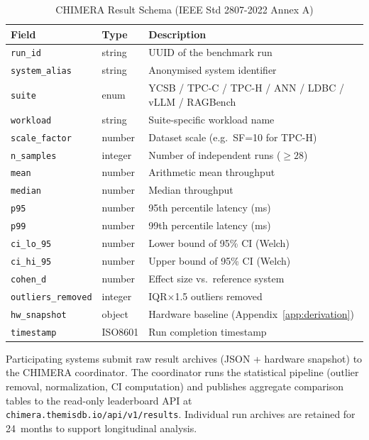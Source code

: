 \documentclass[conference]{IEEEtran}
\begin{document}
\begin{table}[h]
  \caption{CHIMERA Result Schema (IEEE Std 2807-2022 Annex A)}
  \label{tab:chimera-schema}
  \centering
  \begin{tabular}{L{2.2cm}L{1.5cm}L{3.5cm}}
    \toprule
    \textbf{Field} & \textbf{Type} & \textbf{Description} \\
    \midrule
    \texttt{run\_id}       & string  & UUID of the benchmark run \\
    \texttt{system\_alias} & string  & Anonymised system identifier \\
    \texttt{suite}         & enum    & YCSB / TPC-C / TPC-H / ANN /
                                       LDBC / vLLM / RAGBench \\
    \texttt{workload}      & string  & Suite-specific workload name \\
    \texttt{scale\_factor} & number  & Dataset scale (e.g.\ SF=10 for TPC-H) \\
    \texttt{n\_samples}    & integer & Number of independent runs ($\geq 28$) \\
    \texttt{mean}          & number  & Arithmetic mean throughput \\
    \texttt{median}        & number  & Median throughput \\
    \texttt{p95}           & number  & 95th percentile latency (ms) \\
    \texttt{p99}           & number  & 99th percentile latency (ms) \\
    \texttt{ci\_lo\_95}    & number  & Lower bound of 95\% CI (Welch) \\
    \texttt{ci\_hi\_95}    & number  & Upper bound of 95\% CI (Welch) \\
    \texttt{cohen\_d}      & number  & Effect size vs.\ reference system \\
    \texttt{outliers\_removed} & integer & IQR$\times$1.5 outliers removed \\
    \texttt{hw\_snapshot}  & object  & Hardware baseline (Appendix~\ref{app:derivation}) \\
    \texttt{timestamp}     & ISO8601 & Run completion timestamp \\
    \bottomrule
  \end{tabular}
\end{table}

Participating systems submit raw result archives (JSON + hardware
snapshot) to the CHIMERA coordinator.
The coordinator runs the statistical pipeline (outlier removal,
normalization, CI computation) and publishes aggregate comparison
tables to the read-only leaderboard API at
\texttt{chimera.themisdb.io/api/v1/results}.
Individual run archives are retained for 24~months to support
longitudinal analysis.
\end{document}
